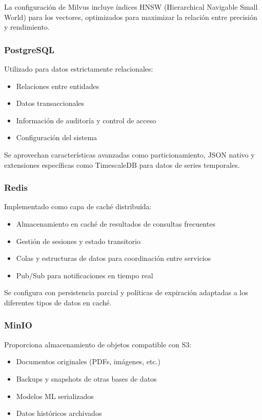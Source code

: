 \documentclass[12pt,a4paper]{article}
\begin{document}
La configuración de Milvus incluye índices HNSW (Hierarchical Navigable Small World) para los vectores, optimizados para maximizar la relación entre precisión y rendimiento.

\subsubsection{PostgreSQL}
Utilizado para datos estrictamente relacionales:
\begin{itemize}
    \item Relaciones entre entidades
    \item Datos transaccionales
    \item Información de auditoría y control de acceso
    \item Configuración del sistema
\end{itemize}

Se aprovechan características avanzadas como particionamiento, JSON nativo y extensiones específicas como TimescaleDB para datos de series temporales.

\subsubsection{Redis}
Implementado como capa de caché distribuida:
\begin{itemize}
    \item Almacenamiento en caché de resultados de consultas frecuentes
    \item Gestión de sesiones y estado transitorio
    \item Colas y estructuras de datos para coordinación entre servicios
    \item Pub/Sub para notificaciones en tiempo real
\end{itemize}

Se configura con persistencia parcial y políticas de expiración adaptadas a los diferentes tipos de datos en caché.

\subsubsection{MinIO}
Proporciona almacenamiento de objetos compatible con S3:
\begin{itemize}
    \item Documentos originales (PDFs, imágenes, etc.)
    \item Backups y snapshots de otras bases de datos
    \item Modelos ML serializados
    \item Datos históricos archivados
\end{itemize}
\end{document}
